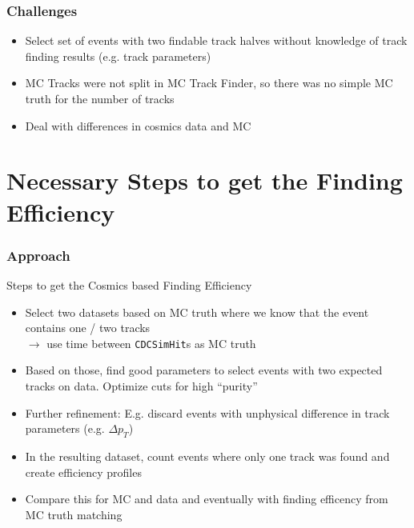 \documentclass[18pt]{beamer}
\begin{document}
\begin{frame}
  \frametitle{Challenges}
  \begin{itemize}
  \item Select set of events with two findable track halves without knowledge of track finding results (e.g. track parameters)
  \item MC Tracks were not split in MC Track Finder, so there was no simple MC truth for the number of tracks
  \item Deal with differences in cosmics data and MC
  \end{itemize}
\end{frame}

\section{Necessary Steps to get the Finding Efficiency}
\begin{frame}
  \frametitle{Approach}
  \begin{block}{Steps to get the Cosmics based Finding Efficiency}
  \begin{itemize}
  \item Select two datasets based on MC truth where we know that the event contains one / two tracks\\
    $\rightarrow$ use time between \texttt{CDCSimHit}s as MC truth
  \item Based on those, find good parameters to select events with two expected tracks on data. Optimize cuts for high ``purity''
  \item Further refinement: E.g. discard events with unphysical difference in track parameters (e.g. $\Delta p_T$)
  \item In the resulting dataset, count events where only one track was found and create efficiency profiles
  \item Compare this for MC and data and eventually with finding efficency from MC truth matching
  \end{itemize}
\end{block}

\end{frame}
\end{document}
